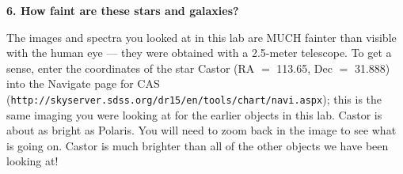 \vspace{30pt}

\noindent
{\bf 6. How faint are these stars and galaxies?}

\noindent The images and spectra you looked at in this lab are MUCH
fainter than visible with the human eye --- they were obtained with a
2.5-meter telescope. To get a sense, enter the coordinates of the star
Castor (RA $=$ 113.65, Dec $=$ 31.888) into the Navigate page for CAS
({\tt http://skyserver.sdss.org/dr15/en/tools/chart/navi.aspx}); this
is the same imaging you were looking at for the earlier objects in
this lab. Castor is about as bright as Polaris.  You will need to zoom
back in the image to see what is going on. Castor is much brighter
than all of the other objects we have been looking at!

\clearpage

